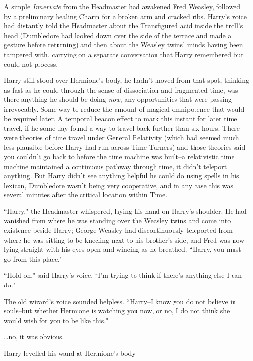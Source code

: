 
\lettrine{A}{} simple \emph{Innervate} from the Headmaster had awakened Fred Weasley, followed by a preliminary healing Charm for a broken arm and cracked ribs. Harry's voice had distantly told the Headmaster about the Transfigured acid inside the troll's head (Dumbledore had looked down over the side of the terrace and made a gesture before returning) and then about the Weasley twins' minds having been tampered with, carrying on a separate conversation that Harry remembered but could not process.

Harry still stood over Hermione's body, he hadn't moved from that spot, thinking as fast as he could through the sense of dissociation and fragmented time, was there anything he should be doing \emph{now}, any opportunities that were passing irrevocably. Some way to reduce the amount of magical omnipotence that would be required later. A temporal beacon effect to mark this instant for later time travel, if he some day found a way to travel back further than six hours. There were theories of time travel under General Relativity (which had seemed much less plausible before Harry had run across Time-Turners) and those theories said you couldn't go back to before the time machine was built\---a relativistic time machine maintained a continuous pathway through time, it didn't teleport anything. But Harry didn't see anything helpful he could do using spells in his lexicon, Dumbledore wasn't being very cooperative, and in any case this was several minutes after the critical location within Time.

``Harry," the Headmaster whispered, laying his hand on Harry's shoulder. He had vanished from where he was standing over the Weasley twins and come into existence beside Harry; George Weasley had discontinuously teleported from where he was sitting to be kneeling next to his brother's side, and Fred was now lying straight with his eyes open and wincing as he breathed. ``Harry, you must go from this place."

``Hold on," said Harry's voice. ``I'm trying to think if there's anything else I can do."

The old wizard's voice sounded helpless. ``Harry\---I know you do not believe in souls\---but whether Hermione is watching you now, or no, I do not think she would wish for you to be like this."

{\ldots}no, it was obvious.

Harry levelled his wand at Hermione's body\---

